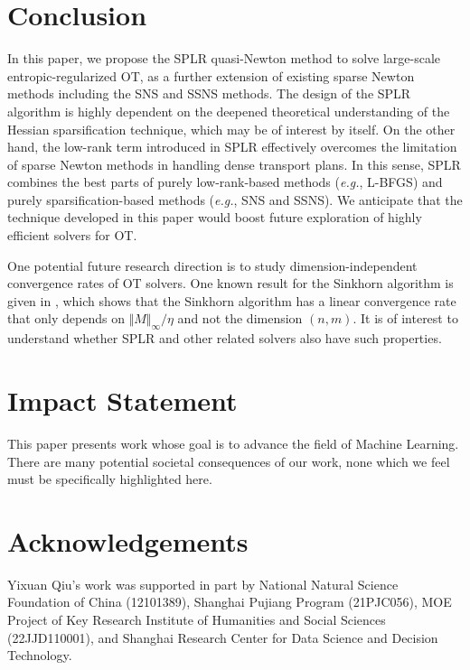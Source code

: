 \documentclass{article}
\theoremstyle{plain}
\theoremstyle{definition}
\theoremstyle{remark}
\begin{document}
\section{Conclusion}
\label{sec:conclusion}
In this paper, we propose the SPLR quasi-Newton method to solve large-scale entropic-regularized OT, as a further extension of existing sparse Newton methods including the SNS \citep{tang2024accelerating} and SSNS \citep{tang2024safe} methods.
The design of the SPLR algorithm is highly dependent on the deepened theoretical understanding of the Hessian sparsification technique, which may be of interest by itself.
On the other hand, the low-rank term introduced in SPLR effectively overcomes the limitation of sparse Newton methods in handling dense transport plans. In this sense, SPLR combines the best parts of purely low-rank-based methods (\emph{e.g.}, L-BFGS) and purely sparsification-based methods (\emph{e.g.}, SNS and SSNS).
We anticipate that the technique developed in this paper would boost future exploration of highly efficient solvers for OT.

One potential future research direction is to study dimension-independent convergence rates of OT solvers. One known result for the Sinkhorn algorithm is given in \citet{carlier2022linear}, which shows that the Sinkhorn algorithm has a linear convergence rate that only depends on $\Vert M \Vert_\infty/\eta$ and not the dimension $(n,m)$. It is of interest to understand whether SPLR and other related solvers also have such properties.



\section*{Impact Statement}
This paper presents work whose goal is to advance the field of Machine Learning. There are many potential societal consequences of our work, none which we feel must be specifically highlighted here.


\section*{Acknowledgements}
Yixuan Qiu’s work was supported in part by National Natural Science Foundation of China (12101389), Shanghai Pujiang Program (21PJC056), MOE Project of Key Research Institute of Humanities and Social Sciences (22JJD110001), and Shanghai Research Center for Data Science and Decision Technology.



\end{document}
